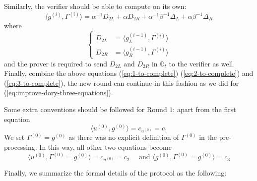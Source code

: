 \documentclass{article}
\begin{document}
Similarly, the verifier should be able to compute on its own:
\begin{equation} \label{eq:3-to-complete}
\langle g^{(i)}, \Gamma^{(i)}\rangle = \alpha^{-1} D_{2L} + \alpha D_{2R} + \alpha^{-1} \beta^{-1} \Delta_L + \alpha \beta^{-1} \Delta_R
\end{equation}
where
\begin{equation*}
\begin{cases}
D_{2L} & =  \langle g^{(i-1)}_{L}, \Gamma^{(i)}\rangle \\
D_{2R} & =  \langle g^{(i-1)}_{R}, \Gamma^{(i)}\rangle 
\end{cases}
\end{equation*}
and the prover is required to send $D_{2L}$ and $D_{2R}$ in $\mathbb{G}_t$ to the verifier as well. Finally, combine the above equations (\ref{eq:1-to-complete}) (\ref{eq:2-to-complete}) and (\ref{eq:3-to-complete}), the new round can continue in this fashion as we did for (\ref{eq:improve-dory-three-equations}).  

Some extra conventions should be followed for Round $1$: apart from the first equation 
\begin{equation*}
\langle u^{(0)}, g^{(0)} \rangle = c_{u^{(0)}} = c_1
\end{equation*}
We set $\Gamma^{(0)} = g^{(0)}$ as there was no explicit definition of $\Gamma^{(0)}$ in the pre-processing. In this way, all other two equations become
\begin{equation*}
\langle u^{(0)}, \Gamma^{(0)} = g^{(0)}\rangle = c_{u^{(0)}} = c_2 \quad \text{ and } \langle g^{(0)}, \Gamma^{(0)} = g^{(0)} \rangle = c_3
\end{equation*}

Finally, we summarize the formal details of the protocol as the following:
\end{document}
